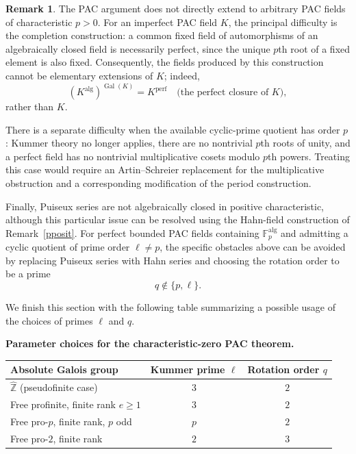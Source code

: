 \documentclass[11pt,a4paper]{amsart}
\renewcommand{\ge}{\geqslant}
\theoremstyle{definition}
\newtheorem{remark}[theorem]{Remark}
\newcommand{\Z}{\mathbb Z}
\newcommand{\alg}{\mathrm{alg}}
\DeclareMathOperator{\Gal}{Gal}
\begin{document}
\begin{remark}\label{nop}
The PAC argument does not directly extend to arbitrary PAC fields
of characteristic $p>0$. For an imperfect PAC field $K$, the
principal difficulty is the completion construction: a common
fixed field of automorphisms of an algebraically closed field
is necessarily perfect, since the unique $p$th root of a fixed
element is also fixed. Consequently, the fields produced by
this construction cannot be elementary extensions of $K$;
indeed,
\[
\left(K^{\alg}\right)^{\Gal(K)}=K^{\mathrm{perf}}\quad \text{(the perfect closure of $K$)},
\]
rather than $K$.

There is a separate difficulty when the available cyclic-prime
quotient has order $p$: Kummer theory no longer applies, there
are no nontrivial $p$th roots of unity, and a perfect field has
no nontrivial multiplicative cosets modulo $p$th powers.
Treating this case would require an Artin--Schreier replacement
for the multiplicative obstruction and a corresponding
modification of the period construction.

Finally, Puiseux series are not algebraically closed in positive
characteristic, although this particular issue can be resolved
using the Hahn-field construction of Remark~\ref{pposit}.
For perfect bounded PAC fields containing
$\mathbb F_p^\alg$ and admitting a cyclic quotient of
prime order $\ell\ne p$, the specific obstacles above can be
avoided by replacing Puiseux series with Hahn series and choosing
the rotation order to be a prime
\[
q\notin\{p,\ell\}.
\]
\end{remark}
We finish this section with the following table summarizing a possible usage of the choices of primes $\ell$ and $q$.
\begin{center}
\small
\textbf{Parameter choices for the characteristic-zero PAC theorem.}
\par\smallskip
\renewcommand{\arraystretch}{1.2}
\begin{tabular}{@{}p{}cc@{}}
\toprule
Absolute Galois group & Kummer prime $\ell$ & Rotation order $q$\\
\midrule
$\widehat{\Z}$ (pseudofinite case) & $3$ & $2$\\
Free profinite, finite rank $e\ge1$ & $3$ & $2$\\
Free pro-$p$, finite rank, $p$ odd & $p$ & $2$\\
Free pro-$2$, finite rank & $2$ & $3$\\
\bottomrule
\end{tabular}
\end{center}
\end{document}

